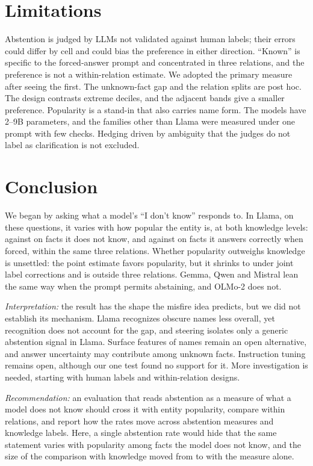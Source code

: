 \documentclass[manuscript,screen,review,anonymous,nonacm]{acmart}
\newcommand{\idk}{``I don't know''}
\begin{document}
\section{Limitations}
\label{sec:limits}

Abstention is judged by LLMs not validated against human labels; their errors could differ by cell and could bias the preference in either direction. ``Known'' is specific to the forced-answer prompt and concentrated in three relations, and the preference is not a within-relation estimate. We adopted the primary measure after seeing the first. The unknown-fact gap and the relation splits are post hoc. The design contrasts extreme deciles, and the adjacent bands give a smaller preference. Popularity is a stand-in that also carries name form. The models have 2--9B parameters, and the families other than Llama were measured under one prompt with few checks. Hedging driven by ambiguity that the judges do not label as clarification is not excluded.

\section{Conclusion}

We began by asking what a model's \idk{} responds to. In Llama, on these questions, it varies with how popular the entity is, at both knowledge levels: \tcObsUnkAbs{} against \tcPopUnkAbs{} on facts it does not know, and \msInKnownRate{} against \msKnownPopRate{} on facts it answers correctly when forced, within the same three relations. Whether popularity outweighs knowledge is unsettled: the point estimate favors popularity, but it shrinks to \rcJoint{} \rcJointCI{} under joint label corrections and is \msOutDiff{} outside three relations. Gemma, Qwen and Mistral lean the same way when the prompt permits abstaining, and OLMo-2 does not.

\emph{Interpretation:} the result has the shape the misfire idea predicts, but we did not establish its mechanism. Llama recognizes obscure names less overall, yet recognition does not account for the gap, and steering isolates only a generic abstention signal in Llama. Surface features of names remain an open alternative, and answer uncertainty may contribute among unknown facts. Instruction tuning remains open, although our one test found no support for it. More investigation is needed, starting with human labels and within-relation designs.

\emph{Recommendation:} an evaluation that reads abstention as a measure of what a model does not know should cross it with entity popularity, compare within relations, and report how the rates move across abstention measures and knowledge labels. Here, a single abstention rate would hide that the same statement varies with popularity among facts the model does not know, and the size of the comparison with knowledge moved from \hjLlamaDiff{} to \faLlamaRegexDiff{} with the measure alone.
\end{document}
